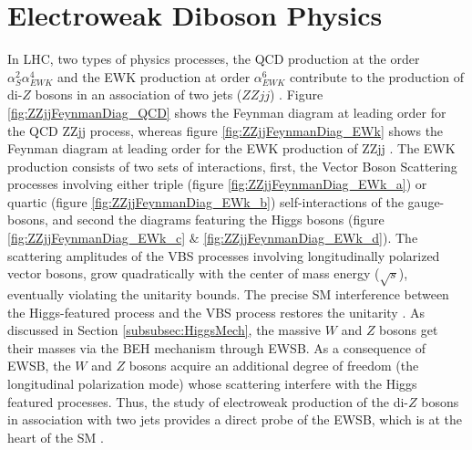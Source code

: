 \section{ Electroweak Diboson Physics }	
\label{sec:EWKPheno}

In LHC, two types of physics processes, the QCD production at the order $\alpha_{S}^{2} \alpha_{EWK}^{4}$ and the EWK production at order $\alpha_{EWK}^6$ contribute to the production of di-$Z$ bosons in an association of two jets ($ZZjj$) \cite{CMSRun2ZZjj}. Figure \ref{fig:ZZjjFeynmanDiag_QCD} shows the Feynman diagram at leading order for the QCD ZZjj process, whereas figure \ref{fig:ZZjjFeynmanDiag_EWk} shows the Feynman diagram at leading order for the EWK production of ZZjj \cite{PowhegV2ZZjj}. The EWK production consists of two sets of interactions, first, the Vector Boson Scattering processes involving either triple (figure \ref{fig:ZZjjFeynmanDiag_EWk_a}) or quartic (figure \ref{fig:ZZjjFeynmanDiag_EWk_b}) self-interactions of the gauge-bosons, and second the diagrams featuring the Higgs bosons (figure \ref{fig:ZZjjFeynmanDiag_EWk_c} $\&$ \ref{fig:ZZjjFeynmanDiag_EWk_d}). The scattering amplitudes of the VBS processes involving longitudinally polarized vector bosons, grow quadratically with the center of mass energy ($\sqrt{s}$), eventually violating the unitarity bounds. The precise SM interference between the Higgs-featured process and the VBS process restores the unitarity  \cite{VBSWWWW}. As discussed in Section \ref{subsubsec:HiggsMech}, the massive $W$ and $Z$ bosons get their masses via the BEH mechanism through EWSB. As a consequence of EWSB, the $W$ and $Z$ bosons acquire an additional degree of freedom (the longitudinal polarization mode) whose scattering interfere with the Higgs featured processes. Thus, the study of electroweak production of the di-$Z$ bosons in association with two jets provides a direct probe of the EWSB, which is at the heart of the SM \cite{CMSRun2ZZjj}. 

